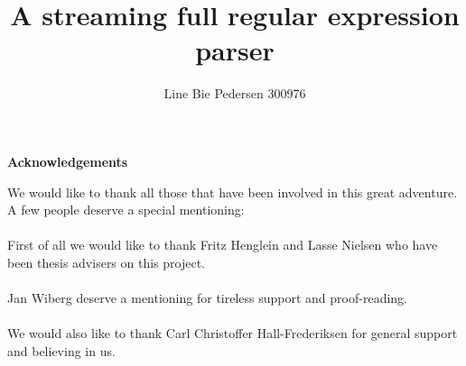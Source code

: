 \documentclass[11pt, english, a4paper]{article}
\title{A streaming full regular expression parser}
\author{Line Bie Pedersen 300976}
\date{}
\makeatletter
\newcommand\ackname{Acknowledgements}
\newenvironment{acknowledgements}{%
      \titlepage
      \null\vfil
      \@beginparpenalty\@lowpenalty
      \begin{center}%
        \bfseries \ackname
        \@endparpenalty\@M
      \end{center}}%
     {\par\vfil\null\endtitlepage}
\newenvironment{acknowledgements}{%
      \if@twocolumn
        \section*{\abstractname}%
      \else
        \small
        \begin{center}%
          {\bfseries \ackname\vspace{-.5em}\vspace{\z@}}%
        \end{center}%
        \quotation
      \fi}
      {\if@twocolumn\else\endquotation\fi}
\makeatother
\begin{document}
\maketitle
\thispagestyle{empty}
\clearpage
\setcounter{page}{1}

\clearpage
\tableofcontents
\clearpage
\listoffigures
\clearpage
\listoftables
\clearpage
\renewcommand{\listtheoremname}{List of definitions}
\listoftheorems[ignoreall, show={definition}]
\clearpage
\renewcommand{\listtheoremname}{List of examples}
\listoftheorems[ignoreall, show={example}]

\clearpage
\begin{acknowledgements}
We would like to thank all those that have been involved in this great
adventure. A few people deserve a special mentioning:\\ \\
First of all we would like to thank Fritz Henglein and Lasse Nielsen
who have been thesis advisers on this project.\\ \\
Jan Wiberg deserve a mentioning for tireless support and
proof-reading.\\  \\
We would also like to thank Carl Christoffer Hall-Frederiksen for
general support and believing in us. 
\end{acknowledgements}
\clearpage

\setcounter{page}{1} 
\listoftodos


\clearpage

\clearpage

\clearpage

\clearpage

\clearpage

\clearpage

\clearpage

\clearpage

\clearpage

\clearpage



\clearpage
\appendix

\end{document}
